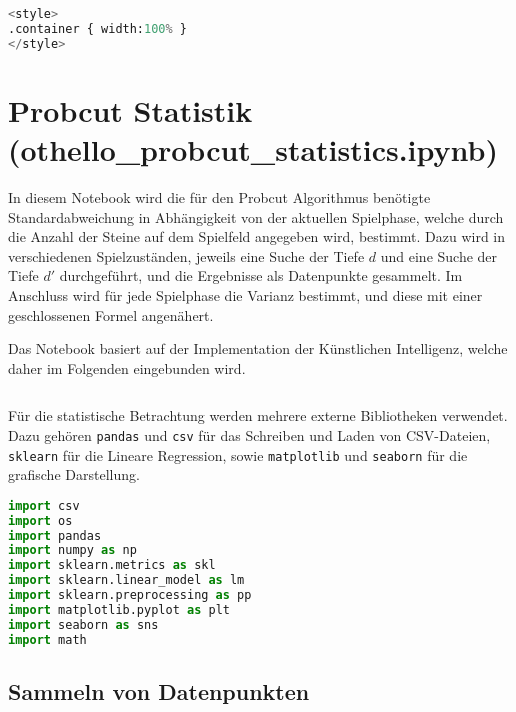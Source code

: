 \begin{lstlisting}[language=Python]
%%HTML
<style>
.container { width:100% }
</style>
\end{lstlisting}

\hypertarget{probcut-statistik-othello_probcut_statistics.ipynb}{%
\section{Probcut Statistik
(othello\_probcut\_statistics.ipynb)}\label{probcut-statistik-othello_probcut_statistics.ipynb}}

In diesem Notebook wird die für den Probcut Algorithmus benötigte
Standardabweichung in Abhängigkeit von der aktuellen Spielphase, welche
durch die Anzahl der Steine auf dem Spielfeld angegeben wird, bestimmt.
Dazu wird in verschiedenen Spielzuständen, jeweils eine Suche der Tiefe
\(d\) und eine Suche der Tiefe \(d'\) durchgeführt, und die Ergebnisse
als Datenpunkte gesammelt. Im Anschluss wird für jede Spielphase die
Varianz bestimmt, und diese mit einer geschlossenen Formel angenähert.

Das Notebook basiert auf der Implementation der Künstlichen Intelligenz,
welche daher im Folgenden eingebunden wird.

\begin{lstlisting}[language=Python]
%run othello_ai.ipynb
\end{lstlisting}

Für die statistische Betrachtung werden mehrere externe Bibliotheken
verwendet. Dazu gehören \passthrough{\lstinline!pandas!} und
\passthrough{\lstinline!csv!} für das Schreiben und Laden von
CSV-Dateien, \passthrough{\lstinline!sklearn!} für die Lineare
Regression, sowie \passthrough{\lstinline!matplotlib!} und
\passthrough{\lstinline!seaborn!} für die grafische Darstellung.

\begin{lstlisting}[language=Python]
import csv
import os
import pandas
import numpy as np
import sklearn.metrics as skl
import sklearn.linear_model as lm
import sklearn.preprocessing as pp
import matplotlib.pyplot as plt
import seaborn as sns
import math
\end{lstlisting}

\hypertarget{sammeln-von-datenpunkten}{%
\subsection{Sammeln von Datenpunkten}\label{sammeln-von-datenpunkten}}

